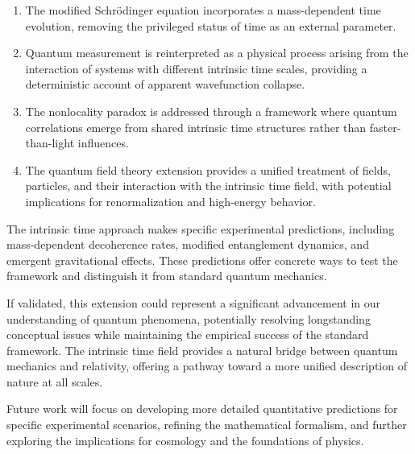 \documentclass[12pt,a4paper]{article}
\begin{document}
	\begin{enumerate}
		\item The modified Schrödinger equation incorporates a mass-dependent time evolution, removing the privileged status of time as an external parameter.
		
		\item Quantum measurement is reinterpreted as a physical process arising from the interaction of systems with different intrinsic time scales, providing a deterministic account of apparent wavefunction collapse.
		
		\item The nonlocality paradox is addressed through a framework where quantum correlations emerge from shared intrinsic time structures rather than faster-than-light influences.
		
		\item The quantum field theory extension provides a unified treatment of fields, particles, and their interaction with the intrinsic time field, with potential implications for renormalization and high-energy behavior.
	\end{enumerate}
	
	The intrinsic time approach makes specific experimental predictions, including mass-dependent decoherence rates, modified entanglement dynamics, and emergent gravitational effects. These predictions offer concrete ways to test the framework and distinguish it from standard quantum mechanics.
	
	If validated, this extension could represent a significant advancement in our understanding of quantum phenomena, potentially resolving longstanding conceptual issues while maintaining the empirical success of the standard framework. The intrinsic time field provides a natural bridge between quantum mechanics and relativity, offering a pathway toward a more unified description of nature at all scales.
	
	Future work will focus on developing more detailed quantitative predictions for specific experimental scenarios, refining the mathematical formalism, and further exploring the implications for cosmology and the foundations of physics.
	
\end{document}
